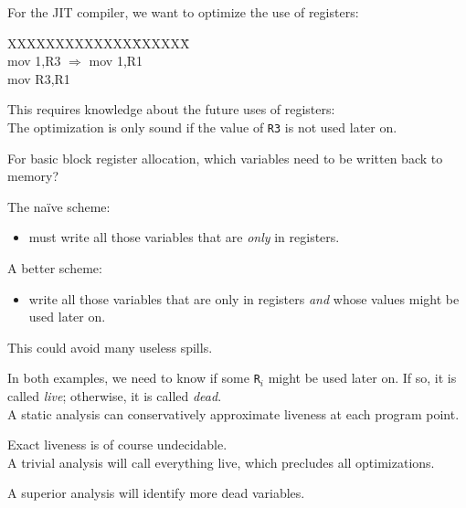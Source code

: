 \begin{slide*}
For the JIT compiler, we want to optimize the use of registers:
\begin{tt}
\begin{tabbing}
XXXXXXXXXXXXX\=XXXXXX\=\kill
\\
mov 1,R3  \>   $\Longrightarrow$ \>   mov 1,R1 \\
mov R3,R1 \\
 
\end{tabbing}
\end{tt}
This requires knowledge about the future uses of registers:\\

The optimization is only sound if the value of {\tt R3} is not used
later on.

\vfil
\end{slide*}
 
\begin{slide*}
For basic block register allocation,  which variables
need to be written back to memory?

The na\"ive scheme:
\begin{itemize}
\item must write all those variables that are {\em only\/} in
registers.
\end{itemize}

A better scheme:
\begin{itemize}
\item write all those variables that are only in registers {\em and\/} whose
values might be used later on.
\end{itemize}

This could avoid many useless spills.
\vfil
\end{slide*}

\begin{slide*}
In both examples, we need to know if some {\tt R$_i$} might be used later on.
If so, it is called {\em live}; otherwise, it is called {\em dead}.\\

A static analysis can conservatively approximate liveness at each program point.

Exact liveness is of course undecidable.\\

A trivial analysis will call everything live, which precludes all optimizations.

A superior analysis will identify more dead variables.
\vfil
\end{slide*}
 
